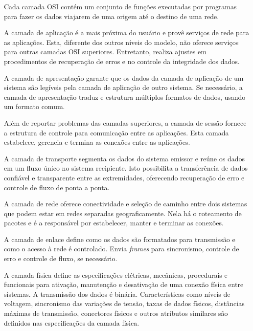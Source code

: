 \documentclass[
12pt,				%
openright,			%
oneside,			%
a4paper,			%
brazil,				%
]{abntex2}
\begin{document}
	\par Cada camada OSI contém um conjunto de funções executadas por programas para fazer os dados viajarem de uma origem até o destino de uma rede.
	
	\par A camada de aplicação é a mais próxima do usuário e provê serviços de rede para as aplicações. Esta, diferente dos outros níveis do modelo, não oferece serviços para outras camadas OSI superiores. Entretanto, realiza ajustes em procedimentos de recuperação de erros e no controle da integridade dos dados.
	
	\par A camada de apresentação garante que os dados da camada de aplicação de um sistema são legíveis pela camada de aplicação de outro sistema. Se necessário, a camada de apresentação traduz e estrutura múltiplos formatos de dados, usando um formato comum.
	
	\par Além de reportar problemas das camadas superiores, a camada de sessão fornece a estrutura de controle para comunicação entre as aplicações. Esta camada estabelece, gerencia e termina as conexões entre as aplicações.
	
	\par A camada de transporte segmenta os dados do sistema emissor e reúne os dados em um fluxo único no sistema recipiente. Isto possibilita a transferência de dados confiável e transparente entre as extremidades, oferecendo recuperação de erro e controle de fluxo de ponta a ponta. 
	
	\par A camada de rede oferece conectividade e seleção de caminho entre dois sistemas que podem estar em redes separadas geograficamente. Nela há o roteamento de pacotes e é a responsável por estabelecer, manter e terminar as conexões.
	
	\par A camada de enlace define como os dados são formatados para transmissão e como o acesso à rede é controlado. Envia \textit{frames} para sincronismo, controle de erro e controle de fluxo, se necessário. 
	
	\par A camada física define as especificações elétricas, mecânicas, procedurais e funcionais para ativação, manutenção e desativação de uma conexão física entre sistemas. A transmissão dos dados é binária. Características como níveis de voltagem, sincronismo das variações de tensão, taxas de dados físicos, distâncias máximas de transmissão, conectores físicos e outros atributos similares são definidos nas especificações da camada física.
	
\end{document}
